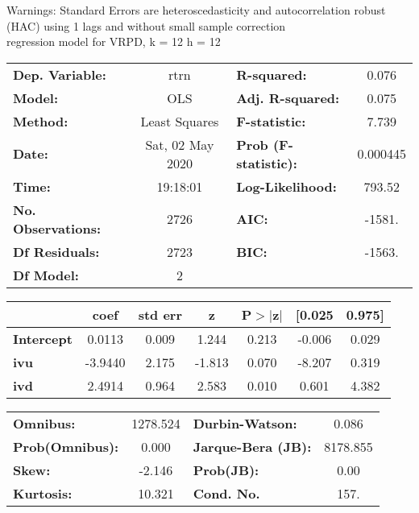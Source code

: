 Warnings: \newline
 [1] Standard Errors are heteroscedasticity and autocorrelation robust (HAC) using 1 lags and without small sample correction\\ 

regression model for VRPD, k = 12 h = 12\begin{center}
\begin{tabular}{lclc}
\toprule
\textbf{Dep. Variable:}    &       rtrn       & \textbf{  R-squared:         } &     0.076   \\
\textbf{Model:}            &       OLS        & \textbf{  Adj. R-squared:    } &     0.075   \\
\textbf{Method:}           &  Least Squares   & \textbf{  F-statistic:       } &     7.739   \\
\textbf{Date:}             & Sat, 02 May 2020 & \textbf{  Prob (F-statistic):} &  0.000445   \\
\textbf{Time:}             &     19:18:01     & \textbf{  Log-Likelihood:    } &    793.52   \\
\textbf{No. Observations:} &        2726      & \textbf{  AIC:               } &    -1581.   \\
\textbf{Df Residuals:}     &        2723      & \textbf{  BIC:               } &    -1563.   \\
\textbf{Df Model:}         &           2      & \textbf{                     } &             \\
\bottomrule
\end{tabular}
\begin{tabular}{lcccccc}
                   & \textbf{coef} & \textbf{std err} & \textbf{z} & \textbf{P$> |$z$|$} & \textbf{[0.025} & \textbf{0.975]}  \\
\midrule
\textbf{Intercept} &       0.0113  &        0.009     &     1.244  &         0.213        &       -0.006    &        0.029     \\
\textbf{ivu}       &      -3.9440  &        2.175     &    -1.813  &         0.070        &       -8.207    &        0.319     \\
\textbf{ivd}       &       2.4914  &        0.964     &     2.583  &         0.010        &        0.601    &        4.382     \\
\bottomrule
\end{tabular}
\begin{tabular}{lclc}
\textbf{Omnibus:}       & 1278.524 & \textbf{  Durbin-Watson:     } &    0.086  \\
\textbf{Prob(Omnibus):} &   0.000  & \textbf{  Jarque-Bera (JB):  } & 8178.855  \\
\textbf{Skew:}          &  -2.146  & \textbf{  Prob(JB):          } &     0.00  \\
\textbf{Kurtosis:}      &  10.321  & \textbf{  Cond. No.          } &     157.  \\
\bottomrule
\end{tabular}
\end{center}

